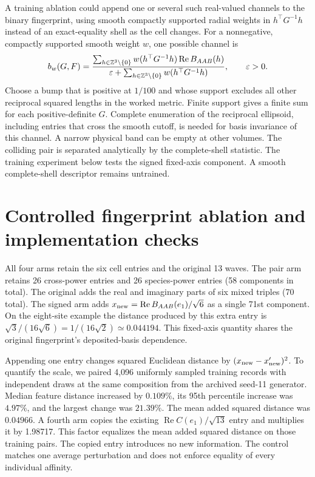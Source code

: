 A training ablation could append one or several such real-valued channels to the binary fingerprint, using smooth compactly supported radial weights in $h^\top G^{-1}h$ instead of an exact-equality shell as the cell changes. For a nonnegative, compactly supported smooth weight $w$, one possible channel is
\[
 b_w(G,F)=
 \frac{\sum_{h\in\mathbb Z^3\setminus\{0\}} w(h^\top G^{-1}h)\operatorname{Re}B_{AAB}(h)}
      {\varepsilon+\sum_{h\in\mathbb Z^3\setminus\{0\}} w(h^\top G^{-1}h)},\qquad \varepsilon>0 .
\]
Choose a bump that is positive at $1/100$ and whose support excludes all other reciprocal squared lengths in the worked metric. Finite support gives a finite sum for each positive-definite $G$. Complete enumeration of the reciprocal ellipsoid, including entries that cross the smooth cutoff, is needed for basis invariance of this channel. A narrow physical band can be empty at other volumes. The colliding pair is separated analytically by the complete-shell statistic. The training experiment below tests the signed fixed-axis component. A smooth complete-shell descriptor remains untrained.

\newpage
\section{Controlled fingerprint ablation and implementation checks}\label{s:ablation}
All four arms retain the six cell entries and the original 13 waves. The pair arm retains 26 cross-power entries and 26 species-power entries (58 components in total). The original adds the real and imaginary parts of six mixed triples (70 total). The signed arm adds $x_{\rm new}=\operatorname{Re}B_{AAB}(e_1)/\sqrt6$ as a single 71st component. On the eight-site example the distance produced by this extra entry is $\sqrt3/(16\sqrt6)=1/(16\sqrt2)\simeq0.044194$. This fixed-axis quantity shares the original fingerprint's deposited-basis dependence.

Appending one entry changes squared Euclidean distance by $(x_{\rm new}-x'_{\rm new})^2$. To quantify the scale, we paired 4,096 uniformly sampled training records with independent draws at the same composition from the archived seed-11 generator. Median feature distance increased by $0.109\%$, its 95th percentile increase was $4.97\%$, and the largest change was $21.39\%$. The mean added squared distance was $0.04966$. A fourth arm copies the existing $\operatorname{Re} C(e_1)/\sqrt{13}$ entry and multiplies it by 1.98717. This factor equalizes the mean added squared distance on those training pairs. The copied entry introduces no new information. The control matches one average perturbation and does not enforce equality of every individual affinity.

